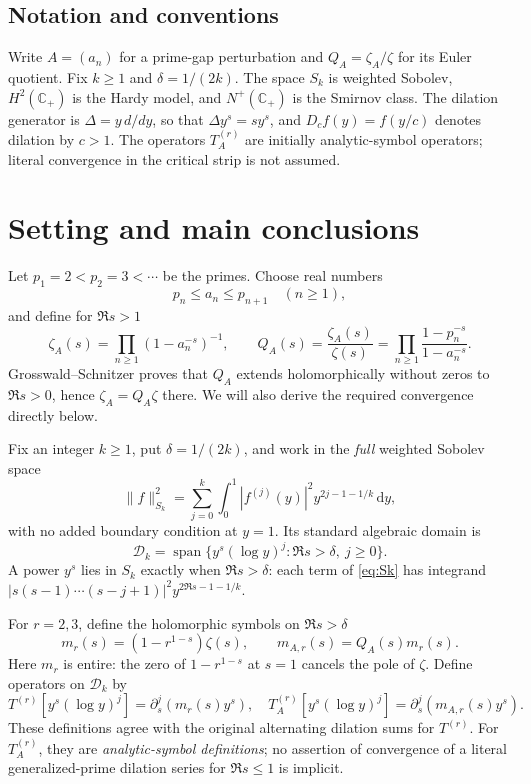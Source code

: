 \documentclass[12pt,letterpaper]{article}
\theoremstyle{remark}
\numberwithin{equation}{section}
\newcommand{\spn}{\operatorname{span}}
\newcommand{\dd}{\,\mathrm d}
\begin{document}
\subsection{Notation and conventions}
Write $A=(a_n)$ for a prime-gap perturbation and
$Q_A=\zeta_A/\zeta$ for its Euler quotient.
Fix $k\ge1$ and $\delta=1/(2k)$.
The space $S_k$ is weighted Sobolev,
$H^2(\mathbb C_+)$ is the Hardy model,
and $N^+(\mathbb C_+)$ is the Smirnov class.
The dilation generator is $\Delta=y\,d/dy$, so that
$\Delta y^s=sy^s$, and $D_cf(y)=f(y/c)$ denotes dilation by $c>1$.
The operators $T_A^{(r)}$ are initially analytic-symbol
operators; literal convergence in the critical strip is not assumed.

\section{Setting and main conclusions}
Let $p_1=2<p_2=3<\cdots$ be the primes. Choose real numbers
\begin{equation}\label{eq:GS}
 p_n\le a_n\le p_{n+1}\quad(n\ge1),
\end{equation}
and define for $\Re s>1$
\begin{equation}\label{eq:Q}
 \zeta_A(s)=\prod_{n\ge1}(1-a_n^{-s})^{-1},\qquad
 Q_A(s)=\frac{\zeta_A(s)}{\zeta(s)}
 =\prod_{n\ge1}\frac{1-p_n^{-s}}{1-a_n^{-s}}.
\end{equation}
Grosswald--Schnitzer \cite{GS} proves that $Q_A$ extends holomorphically without zeros to $\Re s>0$, hence $\zeta_A=Q_A\zeta$ there. We will also derive the required convergence directly below.

Fix an integer $k\ge1$, put $\delta=1/(2k)$, and work in the \emph{full} weighted Sobolev space
\begin{equation}\label{eq:Sk}
 \|f\|_{S_k}^2=\sum_{j=0}^k\int_0^1|f^{(j)}(y)|^2y^{2j-1-1/k}\dd y,
\end{equation}
with no added boundary condition at $y=1$. Its standard algebraic domain is
\[
 \mathcal D_k=\spn\{y^s(\log y)^j:\Re s>\delta,\ j\ge0\}.
\]
A power $y^s$ lies in $S_k$ exactly when $\Re s>\delta$: each term
of \eqref{eq:Sk} has integrand $|s(s-1)\cdots(s-j+1)|^2y^{2\Re s-1-1/k}$.

For $r=2,3$, define the holomorphic symbols on $\Re s>\delta$
\begin{equation}\label{eq:symbols}
 m_r(s)=(1-r^{1-s})\zeta(s),\qquad m_{A,r}(s)=Q_A(s)m_r(s).
\end{equation}
Here $m_r$ is entire: the zero of $1-r^{1-s}$ at $s=1$ cancels the pole of $\zeta$. Define operators on $\mathcal D_k$ by
\begin{equation}\label{eq:operators}
 T^{(r)}[y^s(\log y)^j]=\partial_s^j(m_r(s)y^s),\quad
 T_A^{(r)}[y^s(\log y)^j]=\partial_s^j(m_{A,r}(s)y^s).
\end{equation}
These definitions agree with the original alternating dilation sums for $T^{(r)}$. For $T_A^{(r)}$, they are \emph{analytic-symbol definitions}; no assertion of convergence of a literal generalized-prime dilation series for $\Re s\le1$ is implicit.
\end{document}
